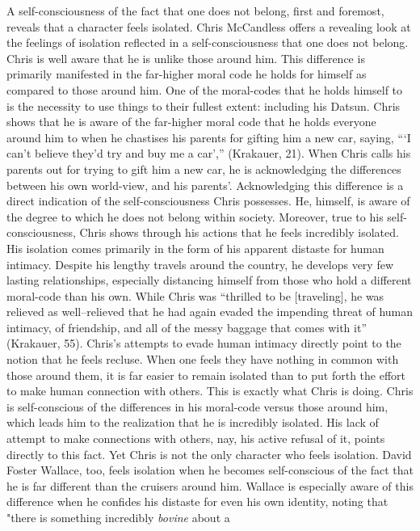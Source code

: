 \documentclass[12pt]{article}
\begin{document}
\begin{mla}
A self-consciousness of the fact that one does not belong, first and foremost,
reveals that a character feels isolated. Chris McCandless offers a revealing
look at the feelings of isolation reflected in a self-consciousness that one
does not belong. Chris is well aware that he is unlike those around him. This
difference is primarily manifested in the far-higher moral code he holds for
himself as compared to those around him. One of the moral-codes that he holds
himself to is the necessity to use things to their fullest extent: including his
Datsun. Chris shows that he is aware of the far-higher moral code that he holds
everyone around him to when he chastises his parents for gifting him a new car,
saying, ```I can't believe they'd try and buy me a car','' (Krakauer, 21). When
Chris calls his parents out for trying to gift him a new car, he is
acknowledging the differences between his own world-view, and his parents'.
Acknowledging this difference is a direct indication of the self-consciousness
Chris possesses. He, himself, is aware of the degree to which he does not belong
within society. Moreover, true to his self-consciousness, Chris shows through
his actions that he feels incredibly isolated. His isolation comes primarily in
the form of his apparent distaste for human intimacy. Despite his lengthy
travels around the country, he develops very few lasting relationships,
especially distancing himself from those who hold a different moral-code than
his own. While Chris was ``thrilled to be [traveling], he was relieved as
well--relieved that he had again evaded the impending threat of human intimacy,
of friendship, and all of the messy baggage that comes with it'' (Krakauer, 55).
Chris's attempts to evade human intimacy directly point to the notion that he
feels recluse. When one feels they have nothing in common with those around
them, it is far easier to remain isolated than to put forth the effort to make
human connection with others. This is exactly what Chris is doing. Chris is
self-conscious of the differences in his moral-code versus those around him,
which leads him to the realization that he is incredibly isolated. His lack of
attempt to make connections with others, nay, his active refusal of it, points
directly to this fact. Yet Chris is not the only character who feels isolation.
David Foster Wallace, too, feels isolation when he becomes self-conscious of the
fact that he is far different than the cruisers around him. Wallace is
especially aware of this difference when he confides his distaste for even his
own identity, noting that "there is something incredibly \textit{bovine} about a

\end{mla}
\end{document}
